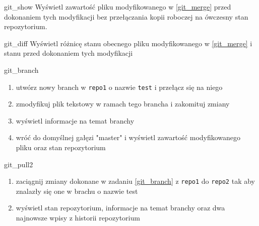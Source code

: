 \begin{Zadanie}{}{git_show}
Wyświetl zawartość pliku modyfikowanego w \ref{git_merge} przed dokonaniem tych modyfikacji bez przełączania kopii roboczej na ówczesny stan repozytorium.
\end{Zadanie}

\begin{Zadanie}{}{git_diff}
Wyświetl różnicę stanu obecnego pliku modyfikowanego w \ref{git_merge} i stanu przed dokonaniem tych modyfikacji
\end{Zadanie}

\begin{Zadanie}{}{git_branch}
\begin{enumerate}
\item utwórz nowy branch w \Verb#repo1# o nazwie \Verb#test# i przełącz się na niego
\item zmodyfikuj plik tekstowy w ramach tego brancha i zakomituj zmiany
\item wyświetl informacje na temat branchy
\item wróć do domyślnej gałęzi "master" i wyświetl zawartość modyfikowanego pliku oraz stan repozytorium
\end{enumerate}
\end{Zadanie}

\begin{Zadanie}{}{git_pull2}
\begin{enumerate}
\item zaciągnij zmiany dokonane w zadaniu \ref{git_branch} z \Verb#repo1# do \Verb#repo2# tak aby znalazły się one w brachu o nazwie test
\item wyświetl stan repozytorium, informacje na temat branchy oraz dwa najnowsze wpisy z historii repozytorium
\end{enumerate}
\end{Zadanie}

